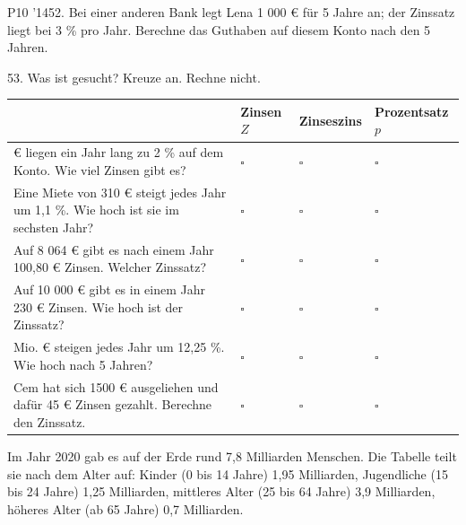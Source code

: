 \documentclass[11pt]{article}
\begin{document}
\pfgruppe{}
\begin{pfaufg}{P10 ’14}{52.}{}
Bei einer anderen Bank legt Lena 1 000 € für 5 Jahre an; der Zinssatz liegt bei 3 \% pro Jahr. Berechne das Guthaben auf diesem Konto nach den 5 Jahren.
\end{pfaufg}
\par\Needspace*{0.55\textheight}
\begin{pfaufg}{}{53.}{}
Was ist gesucht? Kreuze an. Rechne nicht.
\par\smallskip\noindent \begingroup\renewcommand{\arraystretch}{1.4}\begin{tabular}{|>{\raggedright\arraybackslash}p{6.3cm}|>{\centering\arraybackslash\hyphenpenalty=0}p{1.55cm}|>{\centering\arraybackslash\hyphenpenalty=0}p{1.55cm}|>{\centering\arraybackslash\hyphenpenalty=0}p{1.55cm}|}\hline  & {\scriptsize\hspace{0pt}Zinsen $Z$} & {\scriptsize\hspace{0pt}Zinseszins} & {\scriptsize\hspace{0pt}Prozentsatz $p$} \\ \hline 400 € liegen ein Jahr lang zu 2 \% auf dem Konto. Wie viel Zinsen gibt es? & $\square$ & $\square$ & $\square$ \\ \hline Eine Miete von 310 € steigt jedes Jahr um 1,1 \%. Wie hoch ist sie im sechsten Jahr? & $\square$ & $\square$ & $\square$ \\ \hline Auf 8 064 € gibt es nach einem Jahr 100,80 € Zinsen. Welcher Zinssatz? & $\square$ & $\square$ & $\square$ \\ \hline Auf 10 000 € gibt es in einem Jahr 230 € Zinsen. Wie hoch ist der Zinssatz? & $\square$ & $\square$ & $\square$ \\ \hline 614 Mio. € steigen jedes Jahr um 12,25 \%. Wie hoch nach 5 Jahren? & $\square$ & $\square$ & $\square$ \\ \hline Cem hat sich 1500 € ausgeliehen und dafür 45 € Zinsen gezahlt. Berechne den Zinssatz. & $\square$ & $\square$ & $\square$ \\ \hline\end{tabular}\endgroup\par
\end{pfaufg}
\begin{pfaufg}{}{}{}
Im Jahr 2020 gab es auf der Erde rund 7,8 Milliarden Menschen. Die Tabelle teilt sie nach dem Alter auf: Kinder (0 bis 14 Jahre) 1,95 Milliarden, Jugendliche (15 bis 24 Jahre) 1,25 Milliarden, mittleres Alter (25 bis 64 Jahre) 3,9 Milliarden, höheres Alter (ab 65 Jahre) 0,7 Milliarden.
\par\smallskip\noindent {}\par
\end{pfaufg}
\end{document}
